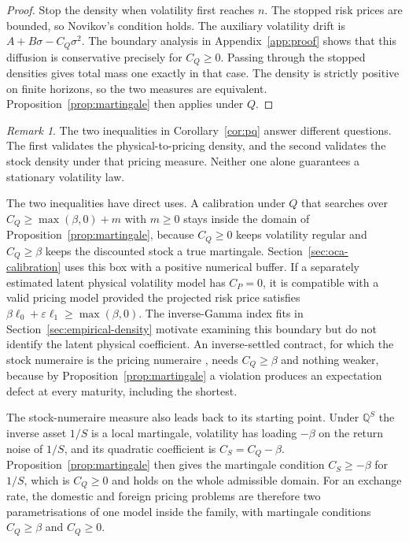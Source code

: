 \documentclass[11pt,a4paper]{article}
\theoremstyle{definition}
\theoremstyle{remark}
\newtheorem*{remark}{Remark}
\newcommand{\QS}{\mathbb{Q}^{S}}
\begin{document}
\begin{proof}
Stop the density when volatility first reaches \(n\). The stopped risk prices are bounded, so Novikov's condition holds. The auxiliary volatility drift is \(A+B\sigma-C_Q\sigma^2\). The boundary analysis in Appendix~\ref{app:proof} shows that this diffusion is conservative precisely for \(C_Q\geq0\). Passing through the stopped densities gives total mass one exactly in that case. The density is strictly positive on finite horizons, so the two measures are equivalent. Proposition~\ref{prop:martingale} then applies under \(Q\).
\end{proof}

\begin{remark}
The two inequalities in Corollary~\ref{cor:pq} answer different questions. The first validates the physical-to-pricing density, and the second validates the stock density under that pricing measure. Neither one alone guarantees a stationary volatility law.
\end{remark}

The two inequalities have direct uses. A calibration under \(Q\) that searches over \(C_Q\geq\max(\beta,0)+m\) with \(m\geq0\) stays inside the domain of Proposition~\ref{prop:martingale}, because \(C_Q\geq0\) keeps volatility regular and \(C_Q\geq\beta\) keeps the discounted stock a true martingale. Section~\ref{sec:oca-calibration} uses this box with a positive numerical buffer. If a separately estimated latent physical volatility model has \(C_P=0\), it is compatible with a valid pricing model provided the projected risk price satisfies \(\beta\ell_0+\varepsilon\ell_1\geq\max(\beta,0)\). The inverse-Gamma index fits in Section~\ref{sec:empirical-density} motivate examining this boundary but do not identify the latent physical coefficient. An inverse-settled contract, for which the stock numeraire is the pricing numeraire \citep{LucicSepp2024}, needs \(C_Q\geq\beta\) and nothing weaker, because by Proposition~\ref{prop:martingale} a violation produces an expectation defect at every maturity, including the shortest.

The stock-numeraire measure also leads back to its starting point. Under \(\QS\) the inverse asset \(1/S\) is a local martingale, volatility has loading \(-\beta\) on the return noise of \(1/S\), and its quadratic coefficient is \(C_S=C_Q-\beta\). Proposition~\ref{prop:martingale} then gives the martingale condition \(C_S\geq-\beta\) for \(1/S\), which is \(C_Q\geq0\) and holds on the whole admissible domain. For an exchange rate, the domestic and foreign pricing problems are therefore two parametrisations of one model inside the family, with martingale conditions \(C_Q\geq\beta\) and \(C_Q\geq0\).
\end{document}
